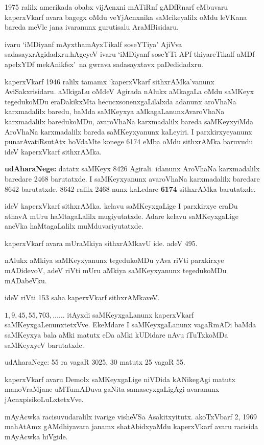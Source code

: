 {\rm 1975} ralilx amerikada obabx vijAcnxni mATiRnf gADfRnarf eMbuvaru kaperxVkarf avara bagegx oMdu veYjAcnxnika saMcikeyalilx oMdu leVKana bareda meVle jana ivaranunx gurutisalu AraMBisidaru.

ivaru `iMDiyanf mAyxthamAyxTikalf soseYTiya' AjiVva sadasayxrAgidadxru.\break hAgeyeV ivaru `iMDiyanf soseYTi APf thiyareTikalf aMDf apelxYDf mekAnikfsx'~na gwrava sadasayxtavx paDedidadxru.

kaperxVkarf {\rm 1946} ralilx tamamx `kaperxVkarf sithxrAMka'vanunx AviSakxrisidaru. aMkigaLu oMdeV Agirada nAlukx aMkagaLa oMdu saMKeyx tegedukoMDu eraDakikxMta hecucx\break sonenxgaLilalxda adanunx aroVhaNa karxmadalilx baredu, baMda saMKeyxya aMkagaLanunx\break AvaroVhaNa karxmadalilx baredukoMDu, avaroVhaNa karxmadalilx bareda saMKeyxyiMda AroVhaNa karxmadalilx bareda saMKeyxyanunx kaLeyiri. I parxkirxyeyanunx punarA\-vatiRsutAtx hoVdaMte konege {\rm 6174} eMba oMdu sithxrAMka baruvudu ideV kaperxVkarf sithxrAMka.

\textbf{udAharaNege:} 
datatx saMKeyx {\rm 8426} Agirali. idanunx AroVhaNa karxmadalilx baredare {\rm 2468} barutatxde. I saMKeyxyanunx avaroVhaNa karxmadalilx baredare { \rm 8642} barutatxde. {\rm 8642} ralilx {\rm 2468} nunx kaLedare {\bf \rm 6174} sithxrAMka barutatxde. 

ideV kaperxVkarf sithxrAMka. kelavu saMKeyxgaLige I parxkirxye eraDu athavA mUru haMtagaLalilx mugiyutatxde. Adare kelavu saMKeyxgaLige aneVka haMtagaLalilx muMduvariyutatxde.

kaperxVkarf avara mUraMkiya sithxrAMkavU ide. adeV {\rm 495}.

nAlukx aMkiya saMKeyxyanunx tegedukoMDu yAva riVti parxkirxye mADidevoV, adeV riVti mUru aMkiya saMKeyxyanunx tegedukoMDu mADabeVku.

ideV riVti {\rm 153} saha kaperxVkarf sithxrAMkaveV.

$1, 9, 45, 55, 703,\ldots\ldots$ itAyxdi saMKeyxgaLanunx kaperxVkarf saMKeyxgaLenunxtetxVve. EkeMdare I saMKeyxgaLanunx vagaRmADi baMda saMKeyxya bala aMki matutx eDa aMki kUDidare nAvu iTuTxkoMDa saMKeyxyeV barutatxde.

udAharaNege: {\rm 55} ra vagaR {\rm 3025}, {\rm 30} matutx {\rm 25} vagaR {\rm 55}.

kaperxVkarf avaru Demolx saMKeyxgaLige niVDida kANikegAgi matutx manoVraMjane uMTumADuva gaNita samaseyxgaLigAgi avaranunx jAcnxpisikoLuLxtetxVve.

mAyAcwka racisuvudaralilx ivarige visheVSa Asakitxyitutx. akoTxVbarf {\rm 2, 1969} mahAtAmx gAMdhiyavara janamx shatAbidxyaMdu kaperxVkarf avaru racisida mAyAcwka hiVgide.
\vskip 0.1cm

